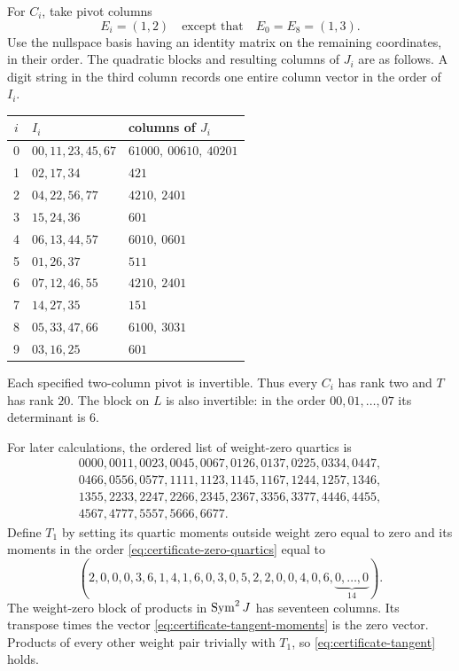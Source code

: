For $C_i$, take pivot columns
\begin{equation}
 E_i=(1,2)\quad\text{except that}\quad E_0=E_8=(1,3).
 \label{eq:certificate-pivots}
\end{equation}
Use the nullspace basis having an identity matrix on the remaining
coordinates, in their order.  The quadratic blocks and resulting columns
of $J_i$ are as follows.  A digit string in the third column records
one entire column vector in the order of $I_i$.
\begin{center}
\begin{tabular}{c l l}
\toprule
$i$&$I_i$&columns of $J_i$\\
\midrule
0&$00,11,23,45,67$&$61000,\ 00610,\ 40201$\\
1&$02,17,34$&$421$\\
2&$04,22,56,77$&$4210,\ 2401$\\
3&$15,24,36$&$601$\\
4&$06,13,44,57$&$6010,\ 0601$\\
5&$01,26,37$&$511$\\
6&$07,12,46,55$&$4210,\ 2401$\\
7&$14,27,35$&$151$\\
8&$05,33,47,66$&$6100,\ 3031$\\
9&$03,16,25$&$601$\\
\bottomrule
\end{tabular}
\end{center}
Each specified two-column pivot is invertible.  Thus every $C_i$ has
rank two and $T$ has rank $20$.  The block on $L$ is also invertible:
in the order $00,01,\ldots,07$ its determinant is $6$.

For later calculations, the ordered list of weight-zero quartics is
\begin{equation}
\begin{gathered}
0000,0011,0023,0045,0067,0126,0137,0225,0334,0447,\\
0466,0556,0577,1111,1123,1145,1167,1244,1257,1346,\\
1355,2233,2247,2266,2345,2367,3356,3377,4446,4455,\\
4567,4777,5557,5666,6677.
\end{gathered}
\label{eq:certificate-zero-quartics}
\end{equation}
Define $T_1$ by setting its quartic moments outside weight zero equal
to zero and its moments in the order
\eqref{eq:certificate-zero-quartics} equal to
\begin{equation}
 (2,0,0,0,3,6,1,4,1,6,0,3,0,5,2,2,0,0,4,0,6,
 \underbrace{0,\ldots,0}_{14}).
 \label{eq:certificate-tangent-moments}
\end{equation}
The weight-zero block of products in $\operatorname{Sym}^2J$ has seventeen columns.
Its transpose times the vector
\eqref{eq:certificate-tangent-moments} is the zero vector.  Products
of every other weight pair trivially with $T_1$, so
\eqref{eq:certificate-tangent} holds.

